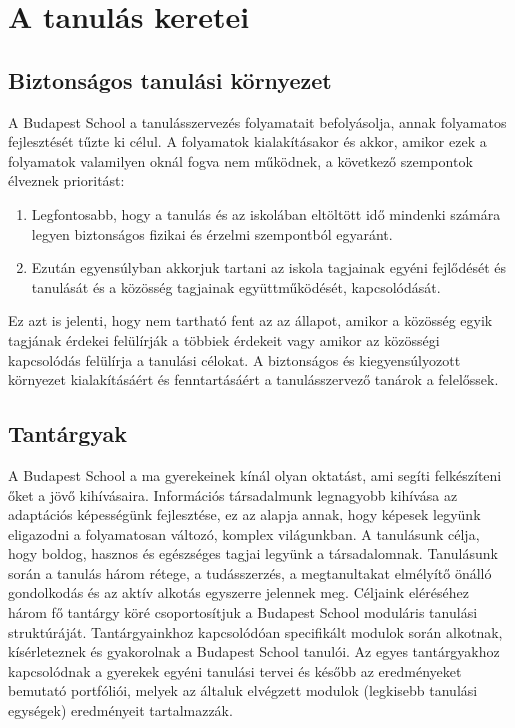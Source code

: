 \chapter{A tanulás keretei}


\section{Biztonságos tanulási környezet}

A Budapest School a tanulásszervezés folyamatait befolyásolja, annak folyamatos fejlesztését tűzte ki célul. A folyamatok kialakításakor és akkor, amikor ezek a folyamatok valamilyen oknál fogva nem működnek, a következő szempontok élveznek prioritást:

\begin{enumerate}

\item Legfontosabb, hogy a tanulás és az iskolában eltöltött idő mindenki számára legyen biztonságos fizikai és érzelmi szempontból egyaránt. 

\item Ezután egyensúlyban akkorjuk tartani az iskola  tagjainak egyéni fejlődését és tanulását és a közösség tagjainak együttműködését, kapcsolódását.

\end{enumerate}
Ez azt is jelenti, hogy nem tartható fent az az állapot, amikor a közösség egyik tagjának érdekei felülírják a többiek érdekeit vagy amikor az közösségi kapcsolódás felülírja a tanulási célokat. A biztonságos és kiegyensúlyozott környezet kialakításáért és fenntartásáért a tanulásszervező tanárok a felelőssek.

\section{Tantárgyak}
\label{sec:tantargyak}
A Budapest School a ma gyerekeinek kínál olyan oktatást, ami segíti felkészíteni őket a jövő kihívásaira. Információs társadalmunk legnagyobb kihívása az adaptációs képességünk fejlesztése, ez az alapja annak, hogy képesek legyünk eligazodni a folyamatosan változó, komplex világunkban. A tanulásunk célja, hogy boldog, hasznos és egészséges tagjai legyünk a társadalomnak. Tanulásunk során a tanulás három rétege, a tudásszerzés, a megtanultakat elmélyítő önálló gondolkodás és az aktív alkotás egyszerre jelennek meg. Céljaink eléréséhez három fő tantárgy köré csoportosítjuk a Budapest School moduláris tanulási struktúráját. Tantárgyainkhoz kapcsolódóan specifikált modulok során alkotnak, kísérleteznek és gyakorolnak a Budapest School tanulói. Az egyes tantárgyakhoz kapcsolódnak a gyerekek egyéni tanulási tervei és később az eredményeket bemutató portfóliói, melyek az általuk elvégzett modulok (legkisebb tanulási egységek) eredményeit tartalmazzák.

